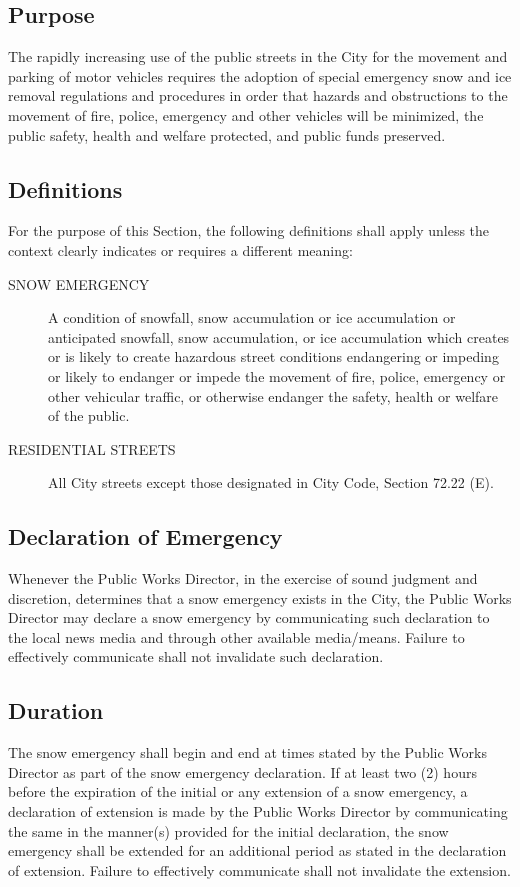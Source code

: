 \subsection{Purpose}
The rapidly increasing use of the public streets in the City for the movement and parking of motor vehicles requires the adoption of special emergency snow and ice removal regulations and procedures in order that hazards and obstructions to the movement of fire, police, emergency and other vehicles will be minimized, the public safety, health and welfare protected, and public funds preserved.
\subsection{Definitions}
For the purpose of this Section, the following definitions shall apply unless the context clearly indicates or requires a different meaning:
\begin{description}
    \item[SNOW EMERGENCY] A condition of snowfall, snow accumulation or ice accumulation or anticipated snowfall, snow accumulation, or ice accumulation which creates or is likely to create hazardous street conditions endangering or impeding or likely to endanger or impede the movement of fire, police, emergency or other vehicular traffic, or otherwise endanger the safety, health or welfare of the public.
    \item[RESIDENTIAL STREETS] All City streets except those designated in City Code, Section 72.22 (E).
\end{description}
\subsection{Declaration of Emergency}
Whenever the Public Works Director, in the exercise of sound judgment and discretion, determines that a snow emergency exists in the City, the Public Works Director may declare a snow emergency by communicating such declaration to the local news media and through other available media/means.  Failure to effectively communicate shall not invalidate such declaration.
\subsection{Duration}
The snow emergency shall begin and end at times stated by the Public Works Director as part of the snow emergency declaration.  If at least two (2) hours before the expiration of the initial or any extension of a snow emergency, a declaration of extension is made by the Public Works Director by communicating the same in the manner(s) provided for the initial declaration, the snow emergency shall be extended for an additional period as stated in the declaration of extension.  Failure to effectively communicate shall not invalidate the extension.
